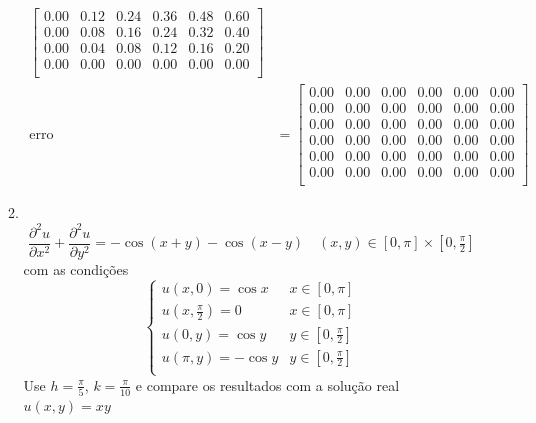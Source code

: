 \documentclass[a4paper, 11pt]{report}
\begin{document}
\begin{enumerate}[leftmargin=*]
\begin{enumerate}[leftmargin=*, label=\alph*.]
\begin{minipage}{0.6\columnwidth}
\begin{align*}
\begin{bmatrix}
                    0.00 & 0.12 & 0.24 & 0.36 & 0.48 & 0.60 \\ 
                    0.00 & 0.08 & 0.16 & 0.24 & 0.32 & 0.40 \\ 
                    0.00 & 0.04 & 0.08 & 0.12 & 0.16 & 0.20 \\ 
                    0.00 & 0.00 & 0.00 & 0.00 & 0.00 & 0.00 \\
                \end{bmatrix}\\
                \text{erro} &= 
                \begin{bmatrix}
                    0.00 & 0.00 & 0.00 & 0.00 & 0.00 & 0.00 \\
                    0.00 & 0.00 & 0.00 & 0.00 & 0.00 & 0.00 \\
                    0.00 & 0.00 & 0.00 & 0.00 & 0.00 & 0.00 \\
                    0.00 & 0.00 & 0.00 & 0.00 & 0.00 & 0.00 \\
                    0.00 & 0.00 & 0.00 & 0.00 & 0.00 & 0.00 \\
                    0.00 & 0.00 & 0.00 & 0.00 & 0.00 & 0.00 \\
                \end{bmatrix}
            \end{align*}
        \end{minipage}

        \item ~
        \[
        \dfrac{\partial^2 u}{\partial x^2} + \dfrac{\partial^2 u}{\partial y^2} = -\cos (x+y) - \cos (x-y) \quad (x,y) \in [0,\pi] \times [0,\tfrac{\pi}{2}]
        \]
        com as condições
        \[
            \left\{  
                \begin{array}{ll}
                    u(x,0) = \cos x & x \in [0,\pi]\\  
                    u(x,\frac{\pi}{2}) = 0 & x \in [0,\pi]\\
                    u(0,y) = \cos y & y \in [0,\frac{\pi}{2}]\\
                    u(\pi,y) = -\cos y & y \in [0,\frac{\pi}{2}]\\
                \end{array}
            \right.
        \]
        Use $h = \frac{\pi}{5}$, $k = \frac{\pi}{10}$ e compare os resultados com a solução real $u(x,y) = xy$
        

\end{enumerate}
\end{enumerate}
\end{document}
